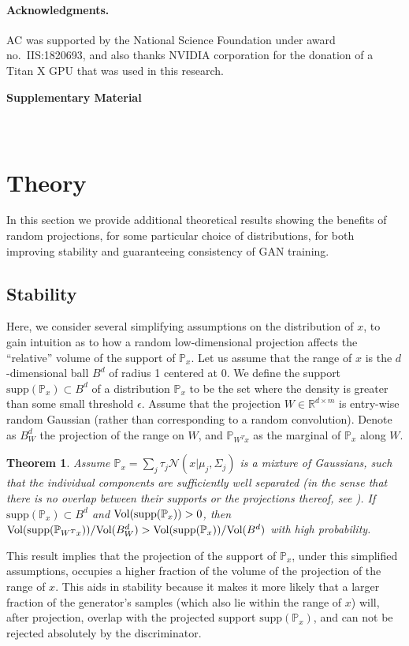 \documentclass{article}
\newcommand{\supp}{\mbox{supp}}
\newcommand{\R}{\mathbb{R}}
\newtheorem{theorem}{Theorem}[section]
\newcommand{\px}{\mathbb{P}_{x}}
\newcommand{\pwx}{\mathbb{P}_{W^Tx}}
\begin{document}
\paragraph{Acknowledgments.} AC was supported by the National Science Foundation under award no.~IIS:1820693, and also thanks NVIDIA corporation for the donation of a Titan X GPU that was used in this research.
\clearpage



\clearpage
\appendix

\begin{center}
  {\LARGE \bf Supplementary Material\\}~\\~
\end{center}
\section{Theory}
In this section we provide additional theoretical results showing the benefits of random projections, for some particular choice of distributions, for both improving stability and guaranteeing consistency of GAN training.

\subsection*{Stability}

Here, we consider several simplifying assumptions on the distribution of $x$, to gain intuition as to how a random low-dimensional projection affects the ``relative'' volume of the support of $\px$. Let us assume that the range of $x$ is the $d$-dimensional ball $B^d$ of radius 1 centered at 0. We define the support $\supp(\px)\subset B^d$ of a distribution $\px$ to be the set where the density is greater than some small threshold $\epsilon$. Assume that the projection $W\in\R^{d\times m}$ is entry-wise random Gaussian (rather than corresponding to a random convolution). Denote as $B^d_W$ the projection of the range on $W$, and $\pwx$ as the marginal of $\px$ along $W$.

\begin{theorem}\label{thm:volume}
Assume $\px = \sum_j \tau_j \mathcal{N}(x|\mu_j,\Sigma_j)$ is a mixture of Gaussians, such that the individual components are sufficiently well separated (in the sense that there is no overlap between their supports or the projections thereof, see \citep{sanjoy}). If $\supp(\px) \subset B^d$ and $\vol(\supp(\px))>0$, then  $\vol(\supp(\pwx))/\vol(B^d_W) > \vol(\supp(\px))/\vol(B^d)$  with high probability.
\end{theorem}
This  result implies that the projection of the support of $\px$, under this simplified assumptions, occupies a higher fraction of the volume of the projection of the range of $x$. This aids in stability because it makes it more likely that a larger fraction of the generator's samples (which also lie within the range of $x$) will, after projection, overlap with the projected support $\supp(\px)$, and can not be rejected absolutely by the discriminator.
\end{document}
